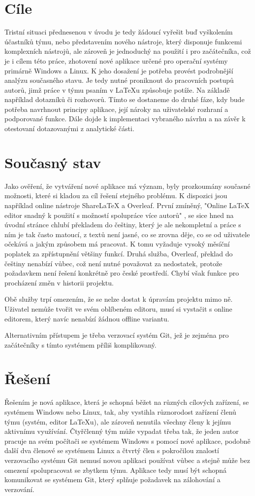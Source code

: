 \documentclass{article}
\begin{document}
\section{Cíle}
Tristní situaci přednesenou v úvodu je tedy žádoucí vyřešit buď vyškolením účastníků týmu, nebo představením nového nástroje, který disponuje funkcemi komplexních nástrojů, ale zároveň je jednoduchý na použití i pro začátečníka, což je i cílem této práce, zhotovení nové aplikace určené pro operační systémy primárně Windows a Linux. K jeho dosažení je potřeba provést podrobnější analýzu současného stavu. Je tedy nutné proniknout do pracovních postupů autorů, jimž práce v týmu psaním v LaTeXu způsobuje potíže. Na základě například dotazníků či rozhovorů. Tímto se dostaneme do druhé fáze, kdy bude potřeba navrhnout principy aplikace, její nároky na uživatelské rozhraní a podporované funkce. Dále dojde k implementaci vybraného návrhu a na závěr k otestovaní dotazovanými z analytické části.

\section{Současný stav}
Jako ověření, že vytváření nové aplikace má význam, byly prozkoumány současné možnosti, které si kladou za cíl řešení stejného problému. K dispozici jsou například online nástroje ShareLaTeX a Overleaf. První zmíněný, "Online LaTeX editor snadný k použití s možností spolupráce více autorů" \citep{cit2}, se sice hned na úvodní stránce chlubí překladem do češtiny, který je ale nekompletní a práce s ním je tak často matoucí, z textů není jasné, co se zrovna děje, co se od uživatele očekává a jakým způsobem má pracovat. K tomu vyžaduje vysoký měsíční poplatek \citep{cit3} za zpřístupnění většiny funkcí. Druhá služba, Overleaf, překlad do češtiny nenabízí vůbec, což není nutné považovat za nedostatek, protože požadavkem není řešení konkrétně pro české prostředí. Chybí však funkce pro procházení změn v historii projektu.

Obě služby trpí omezením, že se nelze dostat k úpravám projektu mimo ně. Uživatel nemůže tvořit ve svém oblíbeném editoru, musí si vystačit s online editorem, který navíc nenabízí žádnou offline variantu.

Alternativním přístupem je třeba verzovací systém Git, jež je zejména pro začátečníky s tímto systémem příliš komplikovaný.

\section{Řešení}
Řešením je nová aplikace, která je schopná běžet na různých cílových zařízení, se systémem Windows nebo Linux, tak, aby vystihla různorodost zařízení členů týmu (systém, editor LaTeXu), ale zároveň nenutila všechny členy k jejímu aktivnímu využívání. Čtyřčlenný tým může vypadat třeba tak, že jeden autor pracuje na svém počítači se systémem Windows s pomocí nové aplikace, podobně další dva členové se systémem Linux a čtvrtý člen s pokročilou znalostí verzovacího systému Git nemusí novou aplikaci používat vůbec a stejně může bez omezení spolupracovat se zbytkem týmu. Aplikace tedy musí být schopná komunikovat se systémem Git, který splňuje požadavek na zálohování a verzování.
\end{document}

